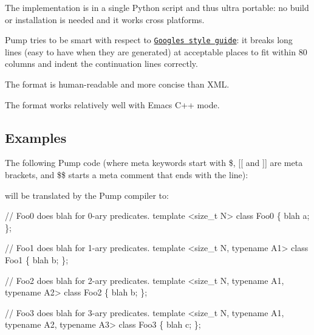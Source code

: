 \begin{DoxyItemize}
\item The implementation is in a single Python script and thus ultra portable\+: no build or installation is needed and it works cross platforms.
\item Pump tries to be smart with respect to \href{http://code.google.com/p/google-styleguide/}{\tt Google\textquotesingle{}s style guide}\+: it breaks long lines (easy to have when they are generated) at acceptable places to fit within 80 columns and indent the continuation lines correctly.
\item The format is human-\/readable and more concise than X\+ML.
\item The format works relatively well with Emacs\textquotesingle{} C++ mode.
\end{DoxyItemize}

\subsection*{Examples}

The following Pump code (where meta keywords start with {\ttfamily \$}, {\ttfamily \mbox{[}\mbox{[}} and {\ttfamily \mbox{]}\mbox{]}} are meta brackets, and {\ttfamily \$\$} starts a meta comment that ends with the line)\+:




will be translated by the Pump compiler to\+:


\begin{DoxyCode}
// Foo0 does blah for 0-ary predicates.
template <size\_t N>
class Foo0 \{
  blah a;
\};

// Foo1 does blah for 1-ary predicates.
template <size\_t N, typename A1>
class Foo1 \{
  blah b;
\};

// Foo2 does blah for 2-ary predicates.
template <size\_t N, typename A1, typename A2>
class Foo2 \{
  blah b;
\};

// Foo3 does blah for 3-ary predicates.
template <size\_t N, typename A1, typename A2, typename A3>
class Foo3 \{
  blah c;
\};
\end{DoxyCode}


